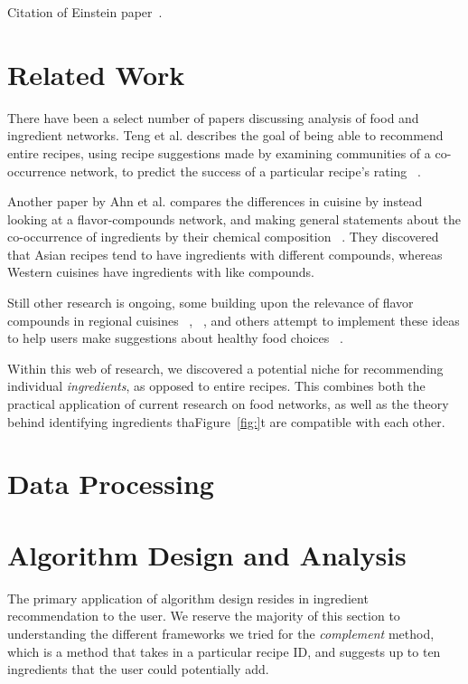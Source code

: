 \documentclass{acm_proc_article-sp}
\begin{document}
Citation of Einstein paper~\cite{Einstein}.

\section{Related Work}

There have been a select number of papers discussing analysis of food and ingredient networks. Teng et al. describes the goal of being able to recommend entire recipes, using recipe suggestions made by examining communities of a co-occurrence network, to predict the success of a particular recipe's rating ~\cite{recommend}. 

Another paper by Ahn et al. compares the differences in cuisine by instead looking at a flavor-compounds network, and making general statements about the co-occurrence of ingredients by their chemical composition ~\cite{pairings}. They discovered that Asian recipes tend to have ingredients with different compounds, whereas Western cuisines have ingredients with like compounds. 

Still other research is ongoing, some building upon the relevance of flavor compounds 
in regional cuisines ~\cite{zhu2013geography}, ~\cite{jain2015analysis}, and others attempt to implement these ideas to help users make suggestions about healthy food choices ~\cite{Geleijnse}.

Within this web of research, we discovered a potential niche for recommending individual \textit{ingredients}, as opposed to entire recipes. This combines both the practical application of current research on food networks, as well as the theory behind identifying ingredients thaFigure~\ref{fig:}t are compatible with each other.


\section{Data Processing}

\section{Algorithm Design and Analysis}

The primary application of algorithm design resides in ingredient recommendation to the user. We reserve the majority of this section to understanding the different frameworks we tried for the \textit{complement} method, which is a method that takes in a particular recipe ID, and suggests up to ten ingredients that the user could potentially add. 
\end{document}

